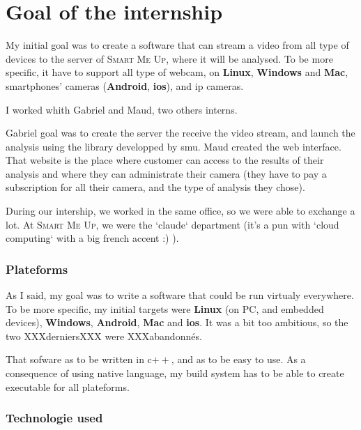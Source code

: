 \documentclass[a4paper,11pt]{custom}
\newcommand{\smu}{\textsc{Smart Me Up}}
\newcommand{\linux}{\textbf{Linux}}
\newcommand{\win}{\textbf{Windows}}
\newcommand{\mac}{\textbf{Mac}}
\newcommand{\android}{\textbf{Android}}
\newcommand{\ios}{\textbf{ios}}
\newcommand{\cpp}{c$++$}
\begin{document}
\chapter{Goal of the internship}

My initial goal was to create a software that can stream a video from all type of
devices to the server of \smu, where it will be analysed. To be more specific,
it have to support all type of webcam, on \linux, \win{} and \mac, smartphones'
cameras (\android, \ios), and ip cameras.

I worked whith Gabriel and Maud, two others interns.

Gabriel goal was to create the server the receive the video stream, and launch
the analysis using the library developped by smu.
Maud created the web interface. That website is the place where customer can
access to the results of their analysis and where they can administrate their
camera (they have to pay a subscription for all their camera, and the type of
analysis they chose).

During our intership, we worked in the same office, so we were able to exchange
a lot. At \smu, we were the `claude` department (it's a pun with `cloud
computing` with a big french accent :) ).

\subsection{Plateforms}

As I said, my goal was to write a software that could be run virtualy
everywhere. To be more specific, my initial targets were \linux{} (on PC, and
embedded devices), \win, \android, \mac{} and \ios. It was a bit too ambitious, so
the two XXXderniersXXX were XXXabandonnés.

That sofware as to be written in \cpp, and as to be easy to use. As a
consequence of using native language, my build system has to be able to create
executable for all plateforms.

\subsection{Technologie used}
\end{document}
